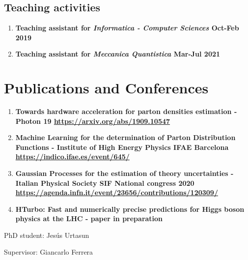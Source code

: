 \documentclass[12pt]{article}
\begin{document}
\subsection{Teaching activities}

\begin{enumerate}{\leftmargin 15pt \itemsep 0pt \topsep 3pt}
	\item{\bf Teaching assistant for \textit{Informatica - Computer Sciences} \hspace{1cm} Oct-Feb 2019}
	\item{\bf Teaching assistant for \textit{Meccanica Quantistica} \hspace{3.5cm} Mar-Jul 2021}
\end{enumerate}

\section{Publications and Conferences}

\begin{enumerate}{\leftmargin 15pt \itemsep 0pt \topsep 3pt}
	\item{\bf Towards hardware acceleration for parton densities estimation - Photon 19 \href{https://arxiv.org/abs/1909.10547}{https://arxiv.org/abs/1909.10547}}
	\item{\bf Machine Learning for the determination of Parton Distribution
		Functions - Institute of High Energy Physics IFAE Barcelona \\ \href{https://indico.ifae.es/event/645/}{https://indico.ifae.es/event/645/}}
	\item{\bf Gaussian Processes for the estimation of theory uncertainties - Italian Physical Society SIF National congress 2020\\ \href{https://agenda.infn.it/event/23656/contributions/120309/}{https://agenda.infn.it/event/23656/contributions/120309/}}
	\item {\bf HTurbo: Fast and numerically precise predictions for Higgs boson physics at the LHC - paper in preparation}
\end{enumerate}

\newpage


\hspace{2cm}


PhD student: Jesús Urtasun\\

\hspace{2cm}

\indent Supervisor: Giancarlo Ferrera
\end{document}
